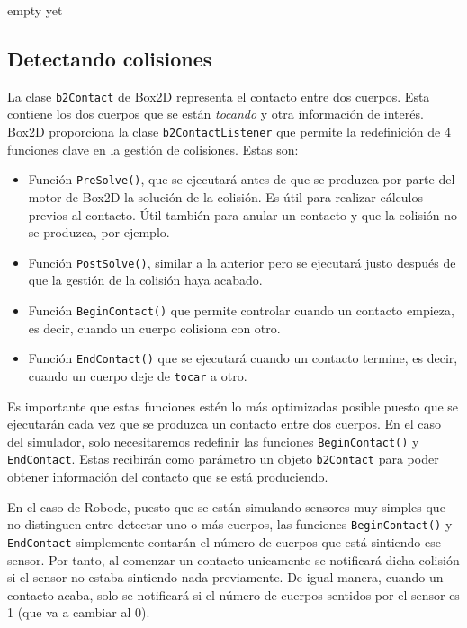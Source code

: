 
{\color{green}
empty yet
}


\subsection{Detectando colisiones}
\label{detectando-colisiones}

La clase \texttt{b2Contact} de Box2D representa el contacto entre dos cuerpos. Esta contiene los dos cuerpos que se están \emph{tocando} y otra información de interés. Box2D proporciona la clase \texttt{b2ContactListener} que permite la redefinición de 4 funciones clave en la gestión de colisiones. Estas son:

\begin{itemize}
	\item Función \texttt{PreSolve()}, que se ejecutará antes de que se produzca por parte del motor de Box2D la solución de la colisión. Es útil para realizar cálculos previos al contacto. Útil también para anular un contacto y que la colisión no se produzca, por ejemplo.
	\item Función \texttt{PostSolve()}, similar a la anterior pero se ejecutará justo después de que la gestión de la colisión haya acabado.
	\item Función \texttt{BeginContact()} que permite controlar cuando un contacto empieza, es decir, cuando un cuerpo colisiona con otro. 
	\item Función \texttt{EndContact()} que se ejecutará cuando un contacto termine, es decir, cuando un cuerpo deje de \texttt{tocar} a otro.
\end{itemize}

Es importante que estas funciones estén lo más optimizadas posible puesto que se ejecutarán cada vez que se produzca un contacto entre dos cuerpos. En el caso del simulador, solo necesitaremos redefinir las funciones \texttt{BeginContact()} y  \texttt{EndContact}. Estas recibirán como parámetro un objeto \texttt{b2Contact} para poder obtener información del contacto que se está produciendo.

En el caso de Robode, puesto que se están simulando sensores muy simples que no distinguen entre detectar uno o más cuerpos, las funciones \texttt{BeginContact()} y \texttt{EndContact} simplemente contarán el número de cuerpos que está sintiendo ese sensor. Por tanto, al comenzar un contacto unicamente se notificará dicha colisión si el sensor no estaba sintiendo nada previamente. De igual manera, cuando un contacto acaba, solo se notificará si el número de cuerpos sentidos por el sensor es 1 (que va a cambiar al 0).

